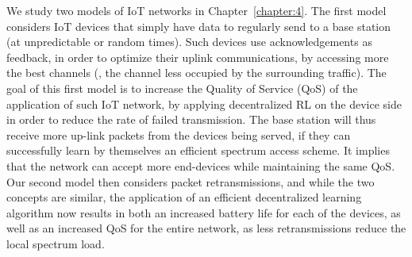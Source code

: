 %
We study two models of IoT networks in Chapter~\ref{chapter:4}.
The first model considers IoT devices that simply have data to regularly send to a base station (at unpredictable or random times).
Such devices use acknowledgements as feedback, in order to optimize their uplink communications, by accessing more the best channels (\ie, the channel less occupied by the surrounding traffic).
The goal of this first model is to increase the Quality of Service (QoS) of the application of such IoT network, by applying decentralized RL on the device side in order to reduce the rate of failed transmission.
The base station will thus receive more up-link packets from the devices being served, if they can successfully learn by themselves an efficient spectrum access scheme.
It implies that the network can accept more end-devices while maintaining the same QoS.
%
Our second model then considers packet retransmissions, and while the two concepts are similar, the application of an efficient decentralized learning algorithm now results in both an increased battery life for each of the devices, as well as an increased QoS for the entire network, as less retransmissions reduce the local spectrum load.

